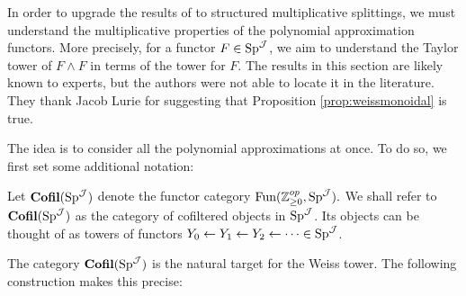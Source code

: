 In order to upgrade the results of \cite{Arone} to structured multiplicative splittings, we must understand the multiplicative properties of the polynomial approximation functors.  More precisely, for a functor $F\in \operatorname{\text{Sp}}^{\operatorname{\mathcal{J}}}$, we aim to understand the Taylor tower of $F\wedge F$ in terms of the tower for $F.$  The results in this section are likely known to experts, but the authors were not able to locate it in the literature.  They thank Jacob Lurie for suggesting that Proposition \ref{prop:weissmonoidal} is true.  

The idea is to consider all the polynomial approximations at once.  To do so, we first set some additional notation:

\begin{dfn} 
Let $\operatorname{\textbf{Cofil}}(\operatorname{\text{Sp}}^{\operatorname{\mathcal{J}}})$ denote the functor category $\operatorname{\text{Fun}}(\operatorname{\mathbb{Z}}_{\geq 0}^{op}, \operatorname{\text{Sp}}^{\operatorname{\mathcal{J}}}).$  We shall refer to $\operatorname{\textbf{Cofil}}(\operatorname{\text{Sp}}^{\operatorname{\mathcal{J}}})$ as the category of cofiltered objects in $\operatorname{\text{Sp}}^{\operatorname{\mathcal{J}}}$.  Its objects can be thought of as towers of functors $Y_0\leftarrow Y_1\leftarrow Y_2 \leftarrow \cdots \in \operatorname{\text{Sp}}^{\operatorname{\mathcal{J}}}$.
\end{dfn}%

The category $\operatorname{\textbf{Cofil}}(\operatorname{\text{Sp}}^{\operatorname{\mathcal{J}}})$ is the natural target for the Weiss tower.  The following construction makes this precise:


